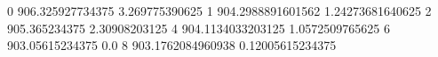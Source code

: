 0 906.325927734375 3.269775390625
1 904.2988891601562 1.24273681640625
2 905.365234375 2.30908203125
4 904.1134033203125 1.0572509765625
6 903.05615234375 0.0
8 903.1762084960938 0.12005615234375
